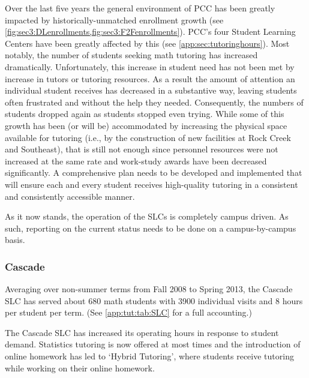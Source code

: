 
Over the last five years the general environment of PCC has been greatly
impacted by historically-unmatched enrollment growth (see \vref{fig:sec3:DLenrollments,fig:sec3:F2Fenrollments}). PCC's four Student
Learning Centers have been greatly affected by this (see \vref{app:sec:tutoringhours}).  
Most notably, the number of students seeking math tutoring has
increased dramatically.  Unfortunately, this increase in student need has not
been met by increase in tutors or tutoring resources.  As a result the
amount of attention an individual student receives has decreased in a
substantive way, leaving students often frustrated and without the help they needed. Consequently, the numbers of students dropped again as students stopped even trying.   While some of this growth has been (or will be) accommodated
by increasing the physical space available for tutoring (i.e., by the
construction of new facilities at Rock Creek and Southeast),
that is still not enough since personnel resources were not increased at the same rate and work-study awards have been decreased significantly.  A comprehensive plan needs to be developed and implemented that will ensure each and every student receives high-quality tutoring in a consistent and consistently accessible manner.

As it now stands, the operation of the SLCs is completely campus driven.  As
such, reporting on the current status needs to be done on a campus-by-campus
basis.

\subsubsection{Cascade}
Averaging over non-summer terms from Fall 2008 to Spring 2013, the Cascade SLC has served about 
680 math students with 3900 individual visits and 8 hours per student per term. (See \vref{app:tut:tab:SLC} for a full accounting.) 

The Cascade SLC has increased its operating hours in response to student
demand. Statistics tutoring is now offered at most times and the introduction of
online homework has led to `Hybrid Tutoring', where students receive tutoring
while working on their online homework. 

